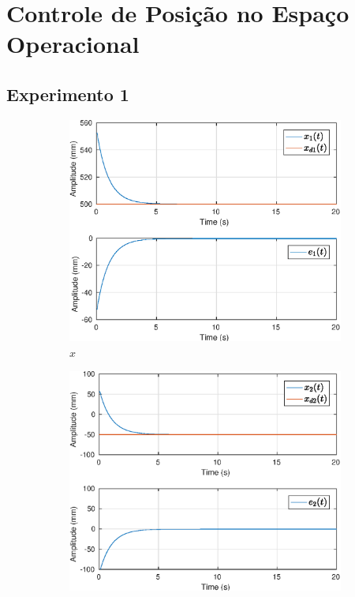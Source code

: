 \section{Controle de Posição no Espaço Operacional}

\subsection{Experimento 1}

\begin{figure}[H]
\centering
\begin{subfigure}{.5\textwidth}
  \centering
  \includegraphics[width=\linewidth]{./img/position1/x1.eps}
  \caption{$x$}
  \label{fig:sub1}
\end{subfigure}%
\begin{subfigure}{.5\textwidth}
  \centering
  \includegraphics[width=\linewidth]{./img/position1/x2.eps}

\end{subfigure}
\end{figure}
